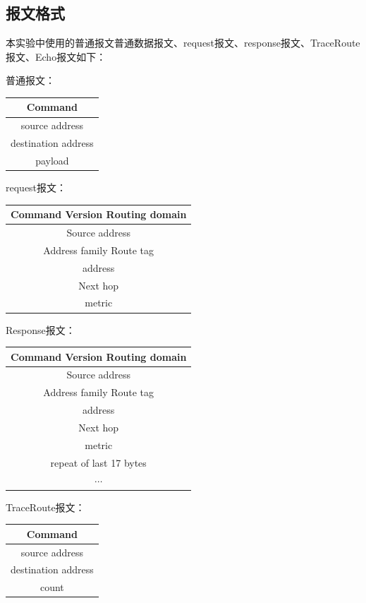 	\subsection{报文格式} %
	\label{sub:报文格式}
	本实验中使用的普通报文普通数据报文、request报文、response报文、TraceRoute报文、Echo报文如下：
	\par 普通报文：
	\begin{table}[H]
		\centering
		\begin{tabular}{|c|}
			\hline
			Command \\
			\hline
			source address \\
			\hline
			destination address \\
			\hline
			payload \\
			\hline
		\end{tabular}		
	\end{table}
	request报文：
	\begin{table}[H]
		\centering
		\begin{tabular}{|c|}
			\hline
			Command \; \vline \; Version \; \vline \; Routing domain \; \\
			\hline
			Source address \\
			\hline
			Address family \; \vline \; Route tag \; \\
			\hline
			address \\
			\hline
			Next hop \\
			\hline
			metric \\
			\hline
		\end{tabular}
	\end{table}
	Response报文：
	\begin{table}[H]
		\centering
		\begin{tabular}{|c|}
			\hline
			Command \; \vline \; Version \; \vline \; Routing domain \; \\
			\hline
			Source address \\
			\hline
			Address family \; \vline \; Route tag \; \\
			\hline
			address \\
			\hline
			Next hop \\
			\hline
			metric \\
			\hline
			repeat of last 17 bytes \\
			\hline
			$\cdots$ \\
			\hline 
		\end{tabular}	
	\end{table}
	TraceRoute报文：
	\begin{table}[H]
	\centering
		\begin{tabular}{|c|}
			\hline
			Command \\
			\hline
			source address \\
			\hline
			destination address \\
			\hline
			count \\
			\hline
		\end{tabular}		
	\end{table}	
